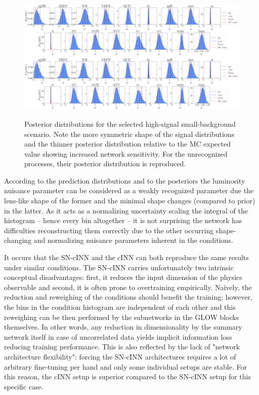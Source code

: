 \begin{figure}[h!]
	\centering
	\includegraphics[width=\linewidth]{figures/inference/194finalNoSummarye11000_posteriors}
	\includegraphics[width=\linewidth]{figures/inference/194finalSummary1Layer11000e300NodesCdim100_posteriors}
	\caption{Posterior distributions for the selected high-signal small-background scenario. Note the more symmetric shape of the signal distributions and the thinner posterior distribution relative to the MC expected value showing increased network sensitivity. For the unrecognized processes, their posterior distribution is reproduced.}
	\label{fig:HS-SM}
\end{figure}

According to the prediction distributions and to the posteriors the luminosity nuisance parameter can be considered as a weakly recognized parameter due the lens-like shape of the former and the minimal shape changes (compared to prior) in the latter. As it acts as a normalizing uncertainty scaling the integral of the histogram -- hence every bin altogether -- it is not surprising the network has difficulties reconstructing them correctly due to the other occurring shape-changing and normalizing nuisance parameters inherent in the conditions.

It occurs that the SN-cINN and the cINN can both reproduce the same results under similar conditions. The SN-cINN carries unfortunately two intrinsic conceptual disadvantages: first, it reduces the input dimension of the physics observable and second, it is often prone to overtraining empirically. Naïvely, the reduction and reweighing of the conditions should benefit the training; however, the bins in the condition histogram are independent of each other and this reweighing can be then performed by the subnetworks in the GLOW blocks themselves. In other words, any reduction in dimensionality by the summary network itself in case of uncorrelated data yields implicit information loss reducing training performance. This is also reflected by the lack of "network architecture flexibility": forcing the SN-cINN architectures requires a lot of arbitrary fine-tuning per hand and only some individual setups are stable. For this reason, the cINN setup is superior compared to the SN-cINN setup for this specific case.